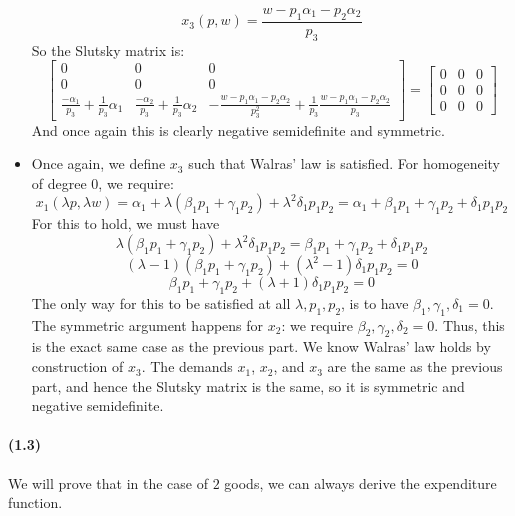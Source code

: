 \documentclass[10pt,letter]{article}
\begin{document}
\begin{itemize}
\[ x_3( p, w) = \frac{w - p_1\alpha_1 - p_2\alpha_2}{p_3} \]
So the Slutsky matrix is:
\[\begin{bmatrix}
0 & 0 & 0 \\
0 & 0 & 0 \\
\frac{-\alpha_1}{p_3} + \frac{1}{p_3}\alpha_1 & \frac{-\alpha_2}{p_3} +\frac{1}{p_3}\alpha_2 & -\frac{w - p_1\alpha_1 - p_2\alpha_2}{p_3^2} + \frac{1}{p_3}\frac{w - p_1\alpha_1 - p_2\alpha_2}{p_3}
\end{bmatrix}
= \begin{bmatrix}
0 & 0 & 0 \\
0 & 0 & 0 \\
0 & 0 & 0
\end{bmatrix}  \]
And once again this is clearly negative semidefinite and symmetric.

\item Once again, we define $x_3$ such that Walras' law is satisfied. For homogeneity of degree 0, we require:
\[ x_1(\lambda p,\lambda w) = \alpha_1 + \lambda(\beta_1 p_1 + \gamma_1 p_2) + \lambda^2\delta_1p_1p_2 = \alpha_1 + \beta_1 p_1 + \gamma_1 p_2 + \delta_1 p_1p_2 \]
For this to hold, we must have
\[ \lambda(\beta_1 p_1 + \gamma_1 p_2) + \lambda^2\delta_1p_1p_2 = \beta_1 p_1 + \gamma_1 p_2 + \delta_1 p_1p_2 \]
\[ (\lambda-1)(\beta_1 p_1 + \gamma_1 p_2) + (\lambda^2-1)\delta_1p_1p_2 = 0  \]
\[ \beta_1 p_1 + \gamma_1 p_2 + (\lambda+1)\delta_1p_1p_2 = 0  \]
The only way for this to be satisfied at all $\lambda, p_1, p_2$, is to have $\beta_1, \gamma_1, \delta_1 = 0$. The symmetric argument happens for $x_2$: we require $\beta_2, \gamma_2, \delta_2 = 0$. Thus, this is the exact same case as the previous part. We know Walras' law holds by construction of $x_3$. The demands $x_1$, $x_2$, and $x_3$ are the same as the previous part, and hence the Slutsky matrix is the same, so it is symmetric and negative semidefinite.
\end{itemize}
\paragraph{(1.3)}
We will prove that in the case of $2$ goods, we can always derive the expenditure function.
\end{document}
